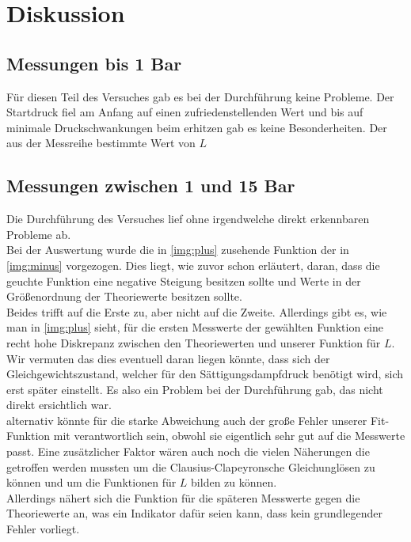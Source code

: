\section{Diskussion}
\subsection{Messungen bis 1 Bar}

Für diesen Teil des Versuches gab es bei der Durchführung keine Probleme. Der Startdruck fiel am Anfang auf einen 
zufriedenstellenden Wert und bis auf minimale Druckschwankungen beim erhitzen gab es keine Besonderheiten.
Der aus der Messreihe bestimmte Wert von $L$ 


\subsection{Messungen zwischen 1 und 15 Bar}

Die Durchführung des Versuches lief ohne irgendwelche direkt erkennbaren Probleme ab.\\
Bei der Auswertung wurde die in \ref{img:plus} zusehende Funktion der in \ref{img:minus} vorgezogen.
Dies liegt, wie zuvor schon erläutert, daran, dass die geuchte Funktion eine negative Steigung besitzen sollte und Werte in der Größenordnung der Theoriewerte besitzen sollte.\\
Beides trifft auf die Erste zu, aber nicht auf die Zweite.
Allerdings gibt es, wie man in \ref{img:plus} sieht, für die ersten Messwerte der gewählten Funktion eine recht hohe Diskrepanz zwischen den Theoriewerten und unserer Funktion für $L$.
Wir vermuten das dies eventuell daran liegen könnte, dass sich der Gleichgewichtszustand, welcher für den Sättigungsdampfdruck benötigt wird, sich erst später einstellt.
Es also ein Problem bei der Durchführung gab, das nicht direkt ersichtlich war.\\
alternativ könnte für die starke Abweichung auch der große Fehler unserer Fit-Funktion mit verantwortlich sein, obwohl sie eigentlich sehr gut auf 
die Messwerte passt. Eine zusätzlicher Faktor wären auch noch die vielen Näherungen die getroffen werden mussten um die Clausius-Clapeyronsche Gleichunglösen zu können
und um die Funktionen für $L$ bilden zu können.\\
Allerdings nähert sich die Funktion für die späteren Messwerte gegen die Theoriewerte an, was ein Indikator dafür seien kann, dass kein grundlegender Fehler vorliegt.\\

